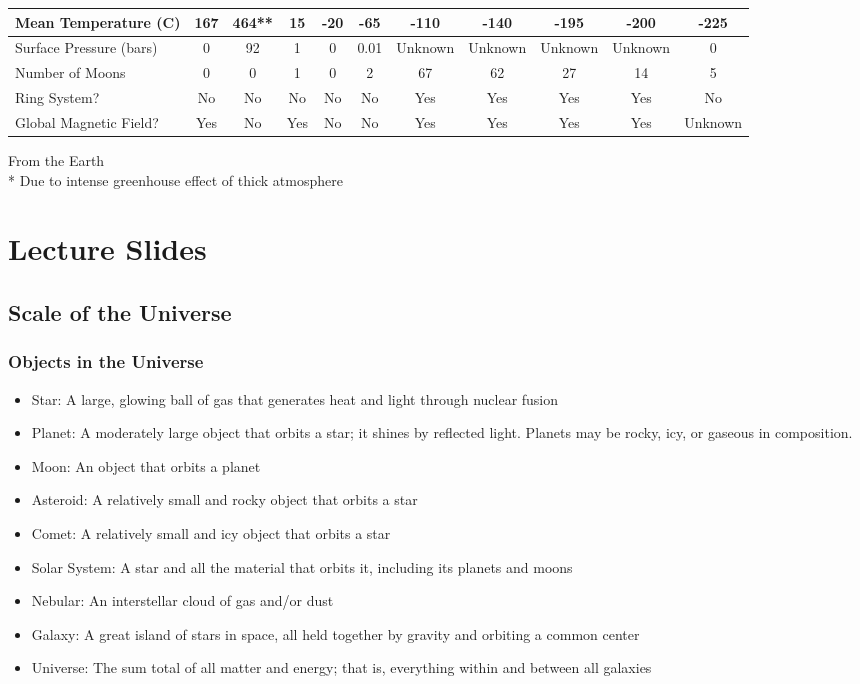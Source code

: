 \documentclass[12pt]{article}
\begin{document}
\begin{center}
{\begin{tabular}{|p{2.5cm}|*{10}{c|}}
    Mean Temperature (C) &  167 &  464** &  15 &  -20 &  -65 &  -110 &  -140 &  -195 &  -200 &  -225 \\ \hline
    Surface Pressure (bars) &  0 &  92 &  1 &  0 &  0.01 &  Unknown &  Unknown &  Unknown &  Unknown &  0 \\ \hline
    Number of Moons &  0 &  0 &  1 &  0 &  2 &  67 &  62 &  27 &  14 &  5 \\ \hline
    Ring System? &  No &  No &  No &  No &  No &  Yes &  Yes &  Yes &  Yes &  No \\ \hline
    Global Magnetic Field? &  Yes &  No &  Yes &  No &  No &  Yes &  Yes &  Yes &  Yes &  Unknown \\ \hline
    \end{tabular}
}
\end{center}
{\footnotesize * From the Earth}\\
{\footnotesize ** Due to intense greenhouse effect of thick atmosphere}\\


\section{Lecture Slides}
\subsection{Scale of the Universe}
\subsubsection{Objects in the Universe}
\begin{itemize}
    \item Star:  A large, glowing ball of gas that generates heat and light through nuclear fusion
    \item Planet: A moderately large object that orbits a star; it shines by reflected light. Planets may be rocky, icy, or gaseous in composition.
    \item Moon: An object that orbits a planet
    \item Asteroid: A relatively small and rocky object that orbits a star
    \item Comet: A relatively small and icy object that orbits a star
    \item Solar System: A star and all the material that orbits it, including its planets and moons
    \item Nebular: An interstellar cloud of gas and/or dust
    \item Galaxy: A great island of stars in space, all held together by gravity and orbiting a common center
    \item Universe: The sum total of all matter and energy; that is, everything within and between all galaxies
\end{itemize}
\end{document}

